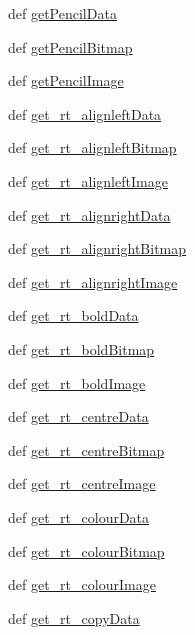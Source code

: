 \begin{DoxyCompactItemize}
def \hyperlink{namespaceimages_a7fae7d68a8725a221f2e706df0158ec9}{getPencilData}
\item 
def \hyperlink{namespaceimages_ade99459cbe2011a90a79b61b844050a7}{getPencilBitmap}
\item 
def \hyperlink{namespaceimages_a16f13e2c8112542d3f25e186e3cc43bd}{getPencilImage}
\item 
def \hyperlink{namespaceimages_af24bff6d7238c3007e96096c5d846ae9}{get\_\-rt\_\-alignleftData}
\item 
def \hyperlink{namespaceimages_a5f42cd58bc3a309ad75d031a1be31268}{get\_\-rt\_\-alignleftBitmap}
\item 
def \hyperlink{namespaceimages_a2fc9c61042b99334314d856014f0668d}{get\_\-rt\_\-alignleftImage}
\item 
def \hyperlink{namespaceimages_a5621dc010b95f0ffa6aea60e6d4cb6c0}{get\_\-rt\_\-alignrightData}
\item 
def \hyperlink{namespaceimages_ad8556ca8876d3628dfb9ae3969233469}{get\_\-rt\_\-alignrightBitmap}
\item 
def \hyperlink{namespaceimages_a18761bf27fe40a5328acf714aabddc31}{get\_\-rt\_\-alignrightImage}
\item 
def \hyperlink{namespaceimages_a6cc6ca9b4130c82edc496c29d0e9d535}{get\_\-rt\_\-boldData}
\item 
def \hyperlink{namespaceimages_acacce974d66ebde6b7cba729840a0d75}{get\_\-rt\_\-boldBitmap}
\item 
def \hyperlink{namespaceimages_a98585de4308b3abfcbd2e7a6706c48dd}{get\_\-rt\_\-boldImage}
\item 
def \hyperlink{namespaceimages_ae6227969dc21d9981cceb400ed7860e2}{get\_\-rt\_\-centreData}
\item 
def \hyperlink{namespaceimages_a74df82e0c451ef923e8f4a1b350fb5e0}{get\_\-rt\_\-centreBitmap}
\item 
def \hyperlink{namespaceimages_a2e988bada70175af4b561eb649261006}{get\_\-rt\_\-centreImage}
\item 
def \hyperlink{namespaceimages_ac87f5ed58c9e7c8cfc59c3c71606251f}{get\_\-rt\_\-colourData}
\item 
def \hyperlink{namespaceimages_a22d385dd153f3ff09bb67103faaa2d9e}{get\_\-rt\_\-colourBitmap}
\item 
def \hyperlink{namespaceimages_a95afe930b5387b2cc6716f06ae1278b3}{get\_\-rt\_\-colourImage}
\item 
def \hyperlink{namespaceimages_a91cadc64c4dbe6f4f82babb53b92bcb7}{get\_\-rt\_\-copyData}
\item 

\end{DoxyCompactItemize}
